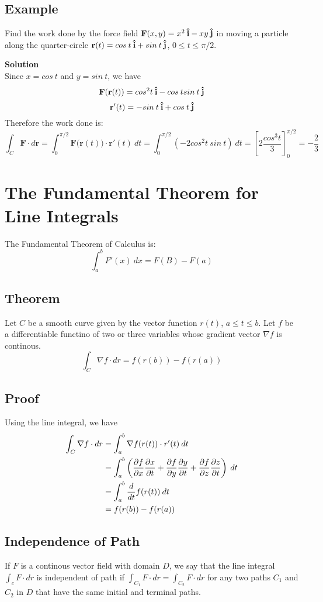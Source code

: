 \subsection*{Example}
Find the work done by the force field $\textbf{F}(x,y)=x^2\:\boldsymbol{\hat{\textbf{i}}}-xy\:\boldsymbol{\hat{\textbf{j}}}$ in moving a
particle along the quarter-circle $\textbf{r}(t)=cos\:t\:\boldsymbol{\hat{\textbf{i}}}+sin\:t\:\boldsymbol{\hat{\textbf{j}}}$,
$0\leq t\leq\pi/2$.

\textbf{Solution} \\
Since $x=cos\:t$ and $y=sin\:t$, we have
$$\mathbf{F(r}(t))=cos^2t\:\boldsymbol{\hat{\textbf{i}}}-cos\:tsin\:t\:\boldsymbol{\hat{\textbf{j}}}$$
$$\textbf{r}'(t)=-sin\:t\:\boldsymbol{\hat{\textbf{i}}}+cos\:t\:\boldsymbol{\hat{\textbf{j}}}$$
Therefore the work done is:
$$\int_C\textbf{F}\cdot d\textbf{r}=\int_0^{\pi/2}\mathbf{F(r}(t))\cdot\textbf{r}'(t)\:dt=
        \int_0^{\pi/2}(-2cos^2t\:sin\:t)\:dt=\left[2\frac{cos^3t}{3}\right]_0^{\pi/2}=-\frac{2}{3}$$

\section{The Fundamental Theorem for Line Integrals}

The Fundamental Theorem of Calculus is:
$$\int_a^b F'(x)\:dx=F(B)-F(a)$$

\subsection*{Theorem}
Let $C$ be a smooth curve given by the vector function $r(t)$, $a\leq t\leq b$.
Let $f$ be a differentiable functino of two or three variables whose gradient vector
$\nabla f$ is continous.
$$\int_C \nabla f\cdot dr=f(r(b))-f(r(a))$$

\subsection*{Proof}
Using the line integral, we have
\begin{align*}
        \int_C \nabla f\cdot dr & =\int_a^b\nabla f(r(t))\cdot r'(t)\:dt                                                   \\
                                & =\int_a^b\left(\pdv{f}{x}\pdv{x}{t}+\pdv{f}{y}\pdv{y}{t}+\pdv{f}{z}\pdv{z}{t}\right)\:dt \\
                                & =\int_a^b \frac{d}{dt} f(r(t))\:dt                                                       \\
                                & =f(r(b))-f(r(a))
\end{align*}

\subsection*{Independence of Path}
If $F$ is a continous vector field with domain $D$, we say that the line integral
$\int_c F\cdot dr$ is independent of path if $\int_{C_1}F\cdot dr=\int_{C_2}F\cdot dr$
for any two paths $C_1$ and $C_2$ in $D$ that have the same initial and terminal paths.

